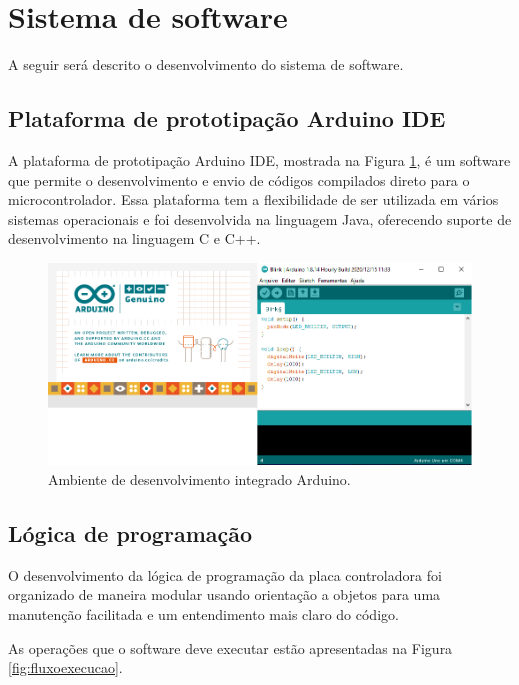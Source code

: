 \section{Sistema de software}\label{sec:metsissof}

A seguir será descrito o desenvolvimento do sistema de software.

\subsection{Plataforma de prototipação Arduino IDE}\label{subsec:metide}

A plataforma de prototipação Arduino \ac{IDE}, mostrada na Figura \ref{fig:idearduino}, 
é um software que permite o desenvolvimento e envio de códigos compilados direto 
para o microcontrolador. Essa plataforma tem a flexibilidade de ser utilizada em 
vários sistemas operacionais e foi desenvolvida na linguagem Java, oferecendo 
suporte de desenvolvimento na linguagem C e C++.

\begin{figure}[H]
\centering
\caption{Ambiente de desenvolvimento integrado Arduino.}\label{fig:idearduino}
\includegraphics[width = 1\linewidth]{figuras/idearduino}
\end{figure}
    
\subsection{Lógica de programação}\label{subsec:metlogica}

O desenvolvimento da lógica de programação da placa controladora foi organizado de maneira modular 
usando orientação a objetos para uma manutenção facilitada e um entendimento mais claro do código.

As operações que o software deve executar estão apresentadas na Figura \ref{fig:fluxoexecucao}.

